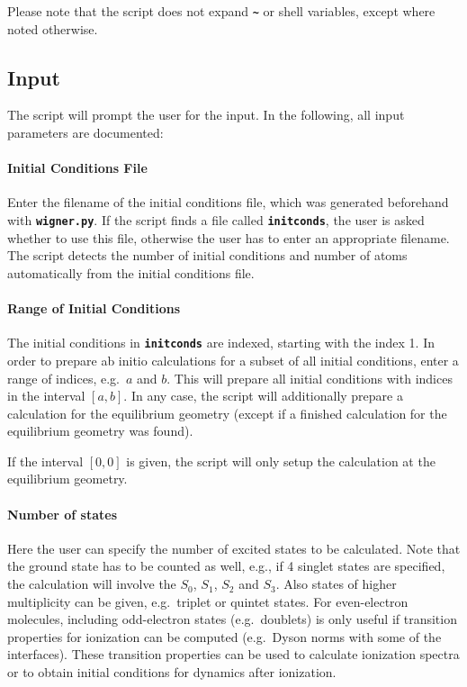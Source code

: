 \documentclass[a4paper,10pt,DIV=15,openany,twoside=false]{scrbook}
\newcommand{\ttt}[1]{\textbf{\texttt{#1}}}
\begin{document}
Please note that the script does not expand \ttt{\textasciitilde} or shell variables, except where noted otherwise.

\subsection{Input}

The script will prompt the user for the input. In the following, all input parameters are documented:

\paragraph{Initial Conditions File}

Enter the filename of the initial conditions file, which was generated beforehand with \ttt{wigner.py}. If the script finds a file called \ttt{initconds}, the user is asked whether to use this file, otherwise the user has to enter an appropriate filename. The script detects the number of initial conditions and number of atoms automatically from the initial conditions file.

\paragraph{Range of Initial Conditions}

The initial conditions in \ttt{initconds} are indexed, starting with the index 1. In order to prepare ab initio calculations for a subset of all initial conditions, enter a range of indices, e.g.\ $a$ and $b$. This will prepare all initial conditions with indices in the interval $[a,b]$. In any case, the script will additionally prepare a calculation for the equilibrium geometry (except if a finished calculation for the equilibrium geometry was found).

If the interval $[0,0]$ is given, the script will only setup the calculation at the equilibrium geometry.

\paragraph{Number of states}

Here the user can specify the number of excited states to be calculated. Note that the ground state has to be counted as well, e.g., if 4 singlet states are specified, the calculation will involve the $S_0$, $S_1$, $S_2$ and $S_3$. Also states of higher multiplicity can be given, e.g.\ triplet or quintet states. 
For even-electron molecules, including odd-electron states (e.g.\ doublets) is only useful if transition properties for ionization can be computed (e.g.\ Dyson norms with some of the interfaces). These transition properties can be used to calculate ionization spectra or to obtain initial conditions for dynamics after ionization.
\end{document}
